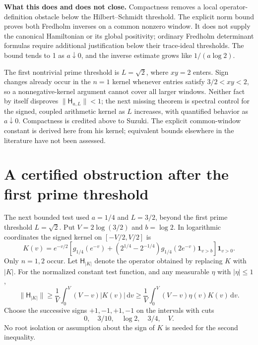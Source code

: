 \documentclass[11pt,letterpaper]{article}
\newcommand{\dd}{\mathrm d}
\begin{document}
\textbf{What this does and does not close.} Compactness removes a local operator-definition obstacle below the Hilbert--Schmidt threshold. The explicit norm bound proves both Fredholm inverses on a common nonzero window. It does not supply the canonical Hamiltonian or its global positivity; ordinary Fredholm determinant formulas require additional justification below their trace-ideal thresholds. The bound tends to 1 as $a\downarrow0$, and the inverse estimate grows like $1/(a\log2)$.

The first nontrivial prime threshold is $L=\sqrt2$, where $xy=2$ enters. Sign changes already occur in the $n=1$ kernel whenever entries satisfy $3/2<xy<2$, so a nonnegative-kernel argument cannot cover all larger windows. Neither fact by itself disproves $\|\mathsf H_{a,L}\|<1$; the next missing theorem is spectral control for the signed, coupled arithmetic kernel as $L$ increases, with quantified behavior as $a\downarrow0$. Compactness is credited above to Suzuki. The explicit common-window constant is derived here from his kernel; equivalent bounds elsewhere in the literature have not been assessed.

\section{A certified obstruction after the first prime threshold}
The next bounded test used $a=1/4$ and $L=3/2$, beyond the first prime threshold $L=\sqrt2$. Put $V=2\log(3/2)$ and $b=\log2$. In logarithmic coordinates the signed kernel on $[-V/2,V/2]$ is
\[
 K(v)=e^{-v/2}\left[g_{1/4}(e^{-v})
 +(2^{1/4}-2^{-1/4})g_{1/4}(2e^{-v})\mathbf1_{v>b}\right]\mathbf1_{v>0}.
\]
Only $n=1,2$ occur. Let $\mathsf H_{|K|}$ denote the operator obtained by replacing $K$ with $|K|$. For the normalized constant test function, and any measurable $\eta$ with $|\eta|\leq1$,
\begin{equation}\label{eq:witness}
 \|\mathsf H_{|K|}\|\geq\frac1V\int_0^V(V-v)|K(v)|\,\dd v
 \geq\frac1V\int_0^V(V-v)\eta(v)K(v)\,\dd v.
\end{equation}
Choose the successive signs $+1,-1,+1,-1$ on the intervals with cuts
\[
 0,\quad 3/10,\quad\log2,\quad3/4,\quad V.
\]
No root isolation or assumption about the sign of $K$ is needed for the second inequality.
\end{document}
